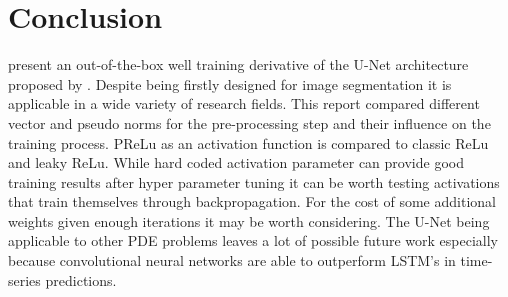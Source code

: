 \documentclass[acmtog]{techreportacmart}
\begin{document}
\section{Conclusion} 
\cite{Thuerey20} present an out-of-the-box well training derivative of the U-Net architecture 
proposed by \cite{ronneberger2015}. Despite being firstly designed for image segmentation it is 
applicable in a wide variety of research fields. This report compared different vector and pseudo 
norms for the pre-processing step and their influence on the training process. PReLu as an activation 
function is compared to classic ReLu and leaky ReLu. While hard coded activation parameter can provide 
good training results after hyper parameter tuning it can be worth testing activations that train 
themselves through backpropagation. For the cost of some additional weights given enough iterations 
it may be worth considering. The U-Net being applicable to other PDE problems leaves a lot of possible 
future work especially because convolutional neural networks are able to outperform LSTM's in time-series predictions.\\

\newpage


\end{document}
